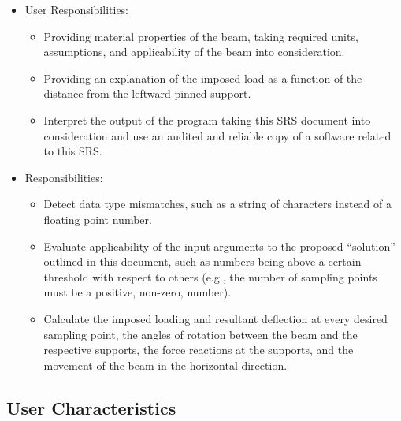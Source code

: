 \documentclass[12pt]{article}
\begin{document}
\begin{itemize}
    \item User Responsibilities:
          \begin{itemize}

              \item Providing material properties of the beam, taking required
                    units, assumptions, and applicability of the beam into
                    consideration.

              \item Providing an explanation of the imposed load as a function
                    of the distance from the leftward pinned support.

              \item Interpret the output of the program taking this SRS document
                    into consideration and use an audited and reliable copy of a
                    software related to this SRS.

          \end{itemize}

    \item \progname{} Responsibilities:
          \begin{itemize}

              \item Detect data type mismatches, such as a string of characters
                    instead of a floating point number.

              \item Evaluate applicability of the input arguments to the
                    proposed ``solution'' outlined in this document, such as
                    numbers being above a certain threshold with respect to
                    others (e.g., the number of sampling points must be a
                    positive, non-zero, number).

              \item Calculate the imposed loading and resultant deflection at
                    every desired sampling point, the angles of rotation between
                    the beam and the respective supports, the force reactions at
                    the supports, and the movement of the beam in the horizontal
                    direction.

          \end{itemize}
\end{itemize}

\subsection{User Characteristics}
\label{SecUserCharacteristics}
\end{document}
